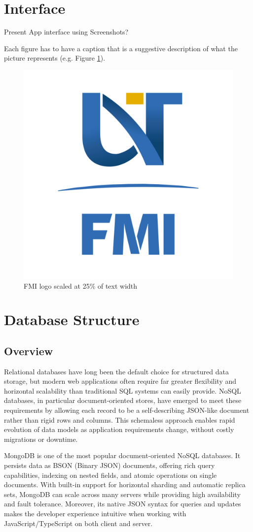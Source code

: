 \section{Interface}
Present App interface using Screenshots?

Each figure has to have a caption that is a suggestive description of what  the  picture represents (e.g. Figure \ref{fig:siglaUVT}).
\begin{figure}[!ht]
    \centering
    \includegraphics[width=0.25\linewidth]{FMI-03.png}
    \caption{ FMI logo scaled at 25\% of text width}
    \label{fig:siglaUVT}
\end{figure}

\section{Database Structure}

\subsection{Overview}

Relational databases have long been the default choice for structured data storage, but modern web applications often require far greater flexibility and horizontal scalability than traditional SQL systems can easily provide.  NoSQL databases, in particular document-oriented stores, have emerged to meet these requirements by allowing each record to be a self-describing JSON-like document rather than rigid rows and columns.  This schemaless approach enables rapid evolution of data models as application requirements change, without costly migrations or downtime.

MongoDB\cite{MONGODB} is one of the most popular document-oriented NoSQL databases.  It persists data as BSON (Binary JSON) documents, offering rich query capabilities, indexing on nested fields, and atomic operations on single documents.  With built-in support for horizontal sharding and automatic replica sets, MongoDB can scale across many servers while providing high availability and fault tolerance.  Moreover, its native JSON syntax for queries and updates makes the developer experience intuitive when working with JavaScript/TypeScript on both client and server.

